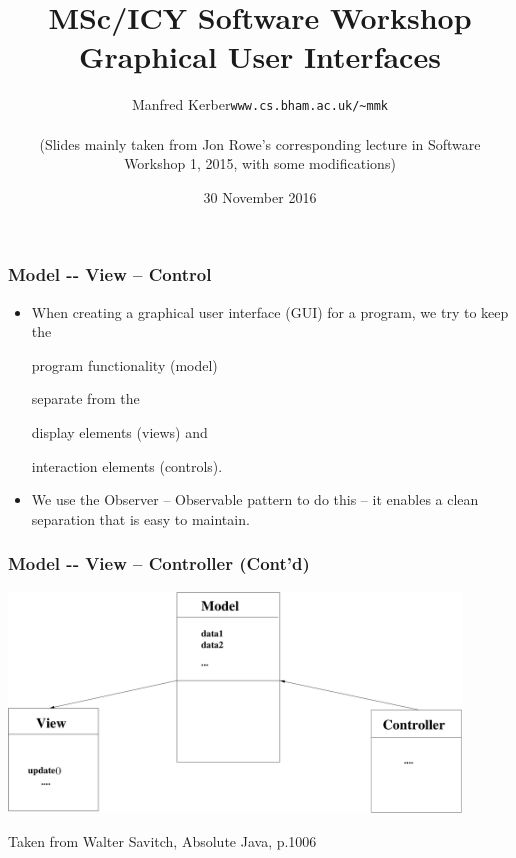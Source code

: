 \documentclass{beamer}
\def\mytoday{30 November 2016}
\def\mcolor#1#2{\rule{0ex}{0ex}\color{#1}#2\color{black}{}}
\begin{document}
\title{MSc/ICY Software Workshop\\
Graphical User Interfaces}

\author[Manfred~Kerber]{\begin{tabular}{ll}
\mcolor{blue}{Manfred Kerber} &   {\tt www.cs.bham.ac.uk/\~{}mmk}
\end{tabular}\\[1ex]
(Slides mainly taken from Jon Rowe's corresponding lecture in Software Workshop 1, 2015, with some modifications)
}

\date{\mytoday}

\begin{frame}
\titlepage
\end{frame}

\begin{frame}[fragile]
\frametitle{Model -‐ View -- Control}
\begin{itemize}
\item When creating a graphical user interface (GUI) for a program, we
  try to keep the \mcolor{blue}{program functionality (model)} \mcolor{red}{separate from} the
  \mcolor{blue}{display elements (views)} and \mcolor{blue}{interaction elements (controls)}.

\item We use the Observer -- Observable pattern to do this -- it
  enables a clean separation that is easy to maintain.
\end{itemize}
\end{frame}

\begin{frame}
\frametitle{Model -‐ View -- Controller (Cont'd)}
\begin{center}
\includegraphics[width=0.9\textwidth]{./model-view-control.pdf}

Taken from Walter Savitch, Absolute Java, p.1006
\end{center}
\end{frame}
\end{document}
